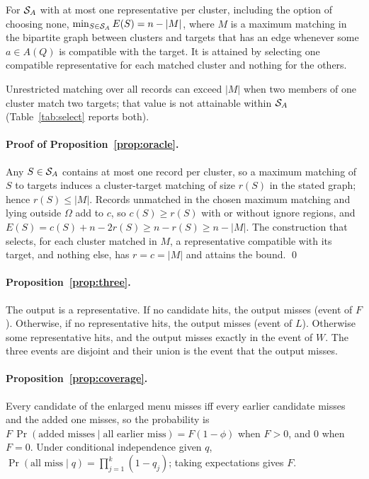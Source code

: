 \begin{proposition}\label{prop:oracle}
For $\mathcal{S}_A$ with at most one representative per cluster, including the option of choosing none, $\min_{S\in\mathcal{S}_A}E(S)=n-|M|$, where $M$ is a maximum matching in the bipartite graph between clusters and targets that has an edge whenever some $a\in A(Q)$ is compatible with the target. It is attained by selecting one compatible representative for each matched cluster and nothing for the others.
\end{proposition}
Unrestricted matching over all records can exceed $|M|$ when two members of one cluster match two targets; that value is not attainable within $\mathcal{S}_A$ (Table~\ref{tab:select} reports both).

\paragraph{Proof of Proposition~\ref{prop:oracle}.} Any $S\in\mathcal{S}_A$ contains at most one record per cluster, so a maximum matching of $S$ to targets induces a cluster-target matching of size $r(S)$ in the stated graph; hence $r(S)\le|M|$. Records unmatched in the chosen maximum matching and lying outside $\Omega$ add to $c$, so $c(S)\ge r(S)$ with or without ignore regions, and $E(S)=c(S)+n-2r(S)\ge n-r(S)\ge n-|M|$. The construction that selects, for each cluster matched in $M$, a representative compatible with its target, and nothing else, has $r=c=|M|$ and attains the bound. \qed

\paragraph{Proposition~\ref{prop:three}.} The output is a representative. If no candidate hits, the output misses (event of $F$). Otherwise, if no representative hits, the output misses (event of $L$). Otherwise some representative hits, and the output misses exactly in the event of $W$. The three events are disjoint and their union is the event that the output misses.

\paragraph{Proposition~\ref{prop:coverage}.} Every candidate of the enlarged menu misses iff every earlier candidate misses and the added one misses, so the probability is $F\,\Pr(\text{added misses}\mid\text{all earlier miss})=F(1-\phi)$ when $F>0$, and $0$ when $F=0$. Under conditional independence given $q$, $\Pr(\text{all miss}\mid q)=\prod_{j=1}^{k}(1-q_j)$; taking expectations gives $F$.

